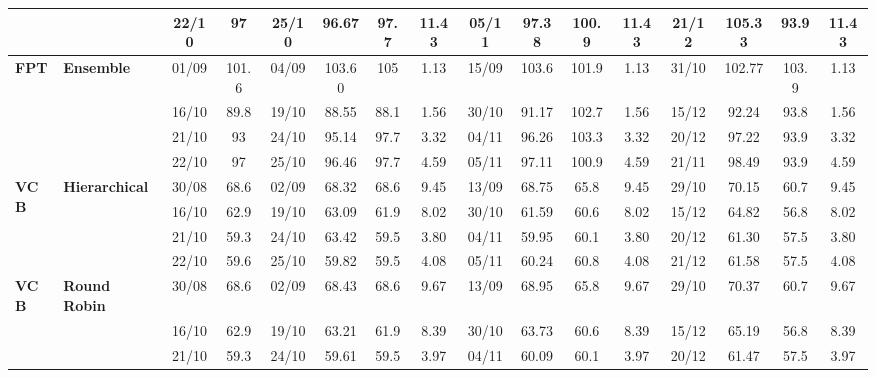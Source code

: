 \documentclass{ieeeaccess}
\begin{document}
\begin{table}[!h]
\begin{tabular}{llcc|cccc|cccc|cccc}
&
& 22/10 & 97 & 25/10 & 96.67 & 97.7 & 11.43 & 05/11 & 97.38 & 100.9 & 11.43 & 21/12 & 105.33 & 93.9 & 11.43 \\
\midrule



\multirow{4}{*}{\textbf{FPT}} 
& \textbf{Ensemble}
& 01/09 & 101.6 & 04/09 & 103.60 & 105 & 1.13 & 15/09 & 103.6 & 101.9 & 1.13 & 31/10 & 102.77 & 103.9 & 1.13 \\

&
& 16/10 & 89.8 & 19/10 & 88.55 & 88.1 & 1.56 & 30/10 & 91.17 & 102.7 & 1.56 & 15/12 & 92.24 & 93.8 & 1.56 \\

&
& 21/10 & 93 & 24/10 & 95.14 & 97.7 & 3.32 & 04/11 & 96.26 & 103.3 & 3.32 & 20/12 & 97.22 & 93.9 & 3.32 \\

&
& 22/10 & 97 & 25/10 & 96.46 & 97.7 & 4.59 & 05/11 & 97.11 & 100.9 & 4.59 & 21/11 & 98.49 & 93.9 & 4.59 \\
\midrule




\multirow{4}{*}{\textbf{VCB}} 
& \textbf{Hierarchical}
& 30/08 & 68.6 & 02/09 & 68.32 & 68.6 & 9.45 & 13/09 & 68.75 & 65.8 & 9.45 & 29/10 & 70.15 & 60.7 & 9.45 \\

&
& 16/10 & 62.9 & 19/10 & 63.09 & 61.9 & 8.02 & 30/10 & 61.59 & 60.6 & 8.02 & 15/12 & 64.82 & 56.8 & 8.02 \\

&
& 21/10 & 59.3 & 24/10 & 63.42 & 59.5 & 3.80 & 04/11 & 59.95 & 60.1 & 3.80 & 20/12 & 61.30 & 57.5 & 3.80 \\

&
& 22/10 & 59.6 & 25/10 & 59.82 & 59.5 & 4.08 & 05/11 & 60.24 & 60.8 & 4.08 & 21/12 & 61.58 & 57.5 & 4.08 \\
\midrule


\multirow{4}{*}{\textbf{VCB}} 
& \textbf{Round Robin}
& 30/08 & 68.6 & 02/09 & 68.43 & 68.6 & 9.67 & 13/09 & 68.95 & 65.8 & 9.67 & 29/10 & 70.37 & 60.7 & 9.67 \\

&
& 16/10 & 62.9 & 19/10 & 63.21 & 61.9 & 8.39 & 30/10 & 63.73 & 60.6 & 8.39 & 15/12 & 65.19 & 56.8 & 8.39 \\

&
& 21/10 & 59.3 & 24/10 & 59.61 & 59.5 & 3.97 & 04/11 & 60.09 & 60.1 & 3.97 & 20/12 & 61.47 & 57.5 & 3.97 \\


\end{tabular}
\end{table}
\end{document}
